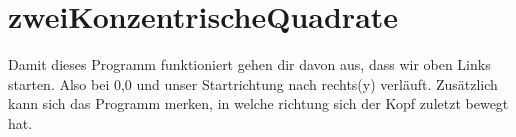 \section{zweiKonzentrischeQuadrate}
Damit dieses Programm funktioniert gehen dir davon aus, dass wir oben Links starten. Also bei 0,0 und unser Startrichtung nach rechts(y) verläuft. Zusätzlich kann sich das Programm merken, in welche richtung sich der Kopf zuletzt bewegt hat.


